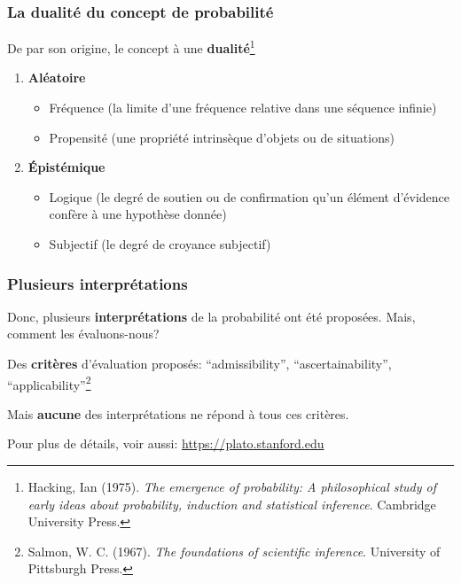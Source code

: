 \documentclass{beamer}
\begin{document}
\begin{frame}
    \frametitle{La dualité du concept de probabilité}

    De par son origine, le concept à une \textbf{dualité}\footnote{
    Hacking, Ian (1975). \emph{The emergence of probability:
    A philosophical study of early ideas about probability,
    induction and statistical inference}. Cambridge University Press.
    }

    \vfill

    \begin{enumerate}
      \item \textbf{Aléatoire}
        \begin{itemize}
          \item Fréquence (la limite d'une fréquence relative dans une séquence infinie)
          \item Propensité (une propriété intrinsèque d'objets ou de situations)
        \end{itemize}
      \item \textbf{Épistémique}
        \begin{itemize}
          \item Logique (le degré de soutien ou de confirmation qu'un élément d'évidence confère à une hypothèse donnée)
          \item Subjectif (le degré de croyance subjectif)
        \end{itemize}
    \end{enumerate}    
\end{frame}


\begin{frame}
    \frametitle{Plusieurs interprétations}
    Donc, plusieurs \textbf{interprétations} de la probabilité ont été proposées. Mais, comment les évaluons-nous?
    
    \vfill

    Des \textbf{critères} d’évaluation proposés: ``admissibility'', ``ascertainability'', ``applicability''\footnote{
    Salmon, W. C. (1967). \emph{The foundations of scientific inference}.
    University of Pittsburgh Press.
    }

    \vfill

    Mais \textbf{aucune} des interprétations ne répond à tous ces critères.

    \vfill

    Pour plus de détails, voir aussi:
    \href{https://plato.stanford.edu/entries/probability-interpret/}{https://plato.stanford.edu}
\end{frame}
\end{document}
